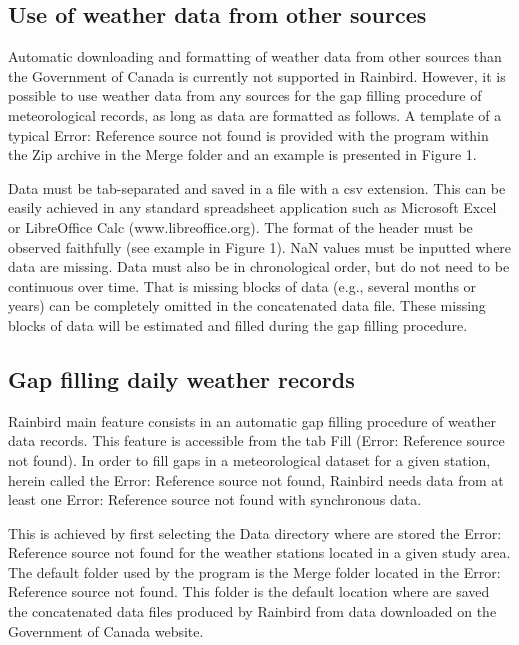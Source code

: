 \documentclass[12pt, letterpaper, fleqn]{report}
\begin{document}
\subsection{Use of weather data from other sources}

Automatic downloading and formatting of weather data from other sources than the Government of Canada is currently not supported in Rainbird. However, it is possible to use weather data from any sources for the gap filling procedure of meteorological records, as long as data are formatted as follows. A template of a typical Error: Reference source not found is provided with the program within the Zip archive in the Merge folder and an example is presented in Figure 1.

Data must be tab-separated and saved in a file with a csv extension. This can be easily achieved in any standard spreadsheet application such as Microsoft Excel or LibreOffice Calc (www.libreoffice.org). The format of the header must be observed faithfully (see example in Figure 1). NaN values must be inputted where data are missing. Data must also be in chronological order, but do not need to be continuous over time. That is missing blocks of data (e.g., several months or years) can be completely omitted in the concatenated data file. These missing blocks of data will be estimated and filled during the gap filling procedure.

\subsection{Gap filling daily weather records}

Rainbird main feature consists in an automatic gap filling procedure of weather data records. This feature is accessible from the tab Fill (Error: Reference source not found). In order to fill gaps in a meteorological dataset for a given station, herein called the Error: Reference source not found, Rainbird needs data from at least one Error: Reference source not found with synchronous data.

This is achieved by first selecting the Data directory where are stored the Error: Reference source not found for the weather stations located in a given study area. The default folder used by the program is the Merge folder located in the Error: Reference source not found. This folder is the default location where are saved the concatenated data files produced by Rainbird from data downloaded on the Government of Canada website.
\end{document}
